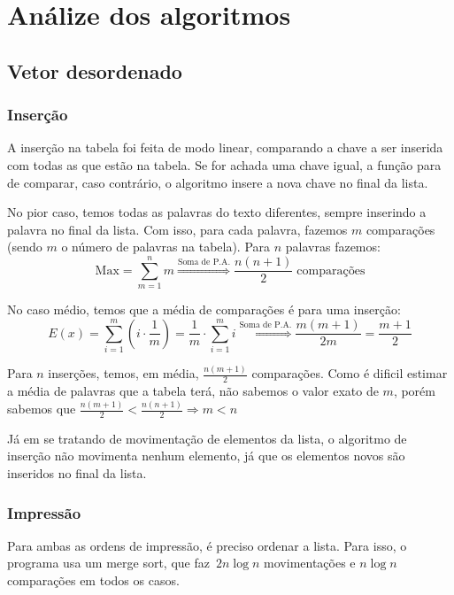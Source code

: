 \documentclass[12pt, a4paper]{article} %
\begin{document}
\section{Análize dos algoritmos}
	\subsection{Vetor desordenado}
		\subsubsection{Inserção}
		\par A inserção na tabela foi feita de modo linear, comparando a chave a ser inserida com todas as que estão na tabela. Se for achada uma chave igual, a função para de comparar, caso contrário, o algoritmo insere a nova chave no final da lista.
		\par No pior caso, temos todas as palavras do texto diferentes, sempre inserindo a palavra no final da lista. Com isso, para cada palavra, fazemos $m$ comparações (sendo $m$ o número de palavras na tabela). Para $n$ palavras fazemos:
		$$
		\text{Max} = \sum^n_{m = 1}m\stackrel{\text{Soma de P.A.}}{\Longrightarrow} \frac{n(n+1)}{2}\;\text{comparações}
		$$
		\par No caso médio, temos que a média de comparações é para uma inserção:
		\begin{equation}
		E(x) = \sum^m_{i=1}\left(i\cdot \frac{1}{m}\right) = \frac{1}{m}\cdot\sum^m_{i=1}i \stackrel{\text{Soma de P.A.}}{\Longrightarrow} \frac{m(m+1)}{2m} = \frac{m+1}{2}
		\end{equation}
		\par Para $n$ inserções, temos, em média, $\frac{n(m+1)}{2}$ comparações. Como é dificil estimar a média de palavras que a tabela terá, não sabemos o valor exato de $m$, porém sabemos que $\frac{n(m+1)}{2}<\frac{n(n+1)}{2}\Rightarrow m<n$
		\par Já em se tratando de movimentação de elementos da lista, o algoritmo de inserção não movimenta nenhum elemento, já que os elementos novos são inseridos no final da lista.
		\subsubsection{Impressão}
		\par Para ambas as ordens de impressão, é preciso ordenar a lista. Para isso, o programa usa um merge sort, que faz $\,2n\log n$ movimentações e $n\log n$ comparações em todos os casos.
\end{document}
